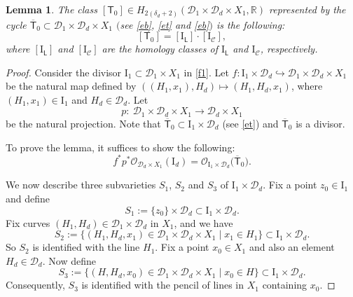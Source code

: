 \documentclass[pdftex]{sigma}
\numberwithin{equation}{section}
\newtheorem{lmm}[thm]{Lemma}
\begin{document}
\begin{lmm}\label{Theo_tzr}
The class $[\mathsf{T}_0] \in H_{2(\delta_d +2)}(\mathcal{D}_1 \times \mathcal{D}_d \times X_1, {\mathbb R})$
represented by the cycle $\overline{\mathsf{T}}_0 \subset \mathcal{D}_1 \times \mathcal{D}_d \times X_1$
$($see \eqref{eb}, \eqref{et} and \eqref{eb}$)$ is the following:
\begin{equation}\label{T0_cycle_expression_base}
[\mathsf{T}_0]  =  [\mathrm{I}_{\mathsf{L}}] \cdot [\mathrm{I}_{\mathcal{C}}],
\end{equation}
where $[\mathrm{I}_{\mathsf{L}}]$ and $[\mathrm{I}_{\mathcal{C}}]$ are the homology classes of
$\mathrm{I}_{\mathsf{L}}$ and $\mathrm{I}_{\mathcal{C}}$, respectively.
\end{lmm}

\begin{proof}
Consider the divisor $\mathrm{I}_1  \subset \mathcal{D}_1\times X_1$ in \eqref{f1}.
Let
$
f \colon  \mathrm{I}_1\times \mathcal{D}_d  \hookrightarrow  \mathcal{D}_1 \times \mathcal{D}_d \times X_1$
be the natural map defined by $((H_1, x_1), H_d) \longmapsto (H_1, H_d, x_1)$, where
$(H_1, x_1) \in \mathrm{I}_1$ and $H_d \in \mathcal{D}_d$. Let
\begin{equation}\label{f3}
p \colon\ \mathcal{D}_1 \times \mathcal{D}_d \times X_1 \longrightarrow
\mathcal{D}_d \times X_1
\end{equation}
be the natural projection. Note that
$
\overline{\mathsf{T}}_0 \subset \mathrm{I}_1\times \mathcal{D}_d
$
(see \eqref{et}) and $\overline{\mathsf{T}}_0$ is a divisor.

To prove the lemma, it suffices to show the following:
\begin{equation}\label{f4}
f^*p^* {\mathcal O}_{\mathcal{D}_d \times X_1}(\mathrm{I}_d) =
{\mathcal O}_{\mathrm{I}_1\times \mathcal{D}_d}\bigl(\overline{\mathsf{T}}_0\bigr).
\end{equation}

We now describe three subvarieties $S_1$, $S_2$ and $S_3$ of $\mathrm{I}_1\times \mathcal{D}_d$. Fix
a point $z_0 \in \mathrm{I}_1$ and define%
\begin{equation}\label{s1}
S_1 := \{z_0\}\times\mathcal{D}_d \subset \mathrm{I}_1\times \mathcal{D}_d.
\end{equation}
Fix curves $(H_1, H_d) \in \mathcal{D}_1 \times \mathcal{D}_d$ in $X_1$, and we have
\begin{equation}\label{s2}
S_2 := \{(H_1, H_d, x_1) \in \mathcal{D}_1 \times \mathcal{D}_d \times X_1
  \mid  x_1 \in H_1\} \subset \mathrm{I}_1\times \mathcal{D}_d.
\end{equation}
So $S_2$ is identified with the line $H_1$. Fix a point $x_0 \in X_1$ and also an
element $H_d \in \mathcal{D}_d$. Now define
\begin{equation}\label{s3}
S_3 := \{(H, H_d, x_0) \in \mathcal{D}_1 \times \mathcal{D}_d \times X_1  \mid
x_0 \in H\} \subset \mathrm{I}_1\times \mathcal{D}_d.
\end{equation}
Consequently, $S_3$ is identified with the pencil of lines in $X_1$ containing $x_0$.


\end{proof}
\end{document}
